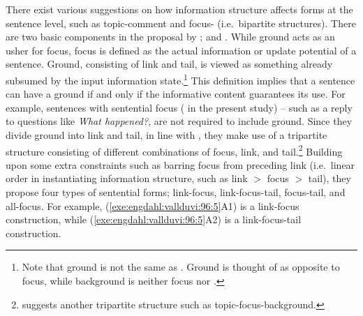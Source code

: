 There exist various suggestions on how information structure affects
forms at the sentence level, such as topic-comment and
focus- (i.e.\ bipartite structures).  There are two basic
components in the proposal by \citeauthor{engdahl:vallduvi:96};
 and . While ground acts as an usher for focus,
focus is defined as the actual information or update potential of a
sentence. Ground, consisting of link and tail, is viewed as something
already subsumed by the input information state.\footnote{Note that
  ground is not the same as . Ground is thought of as
  opposite to focus, while background is neither focus nor
  .}  This definition implies that a sentence can have a
ground if and only if the informative content guarantees its use. For
example, sentences with sentential focus ( in 
the present study) -- such as a reply to
questions like \textit{What happened?}, are not required to include
ground. Since they divide ground into link and tail, in
line with \citet{vallduvi:90}, they make use of a tripartite structure
consisting of different combinations of focus, link, and
tail.\footnote{\citet{buring:03} suggests another tripartite structure
  such as topic-focus-background.} Building upon some extra
constraints such as barring focus from preceding link (i.e.\ linear
order in instantiating information structure, such as link
\ensuremath{>} focus \ensuremath{>} tail), they propose four types of
sentential forms; link-focus, link-focus-tail, focus-tail, and
all-focus. For example, (\ref{exe:engdahl:vallduvi:96:5}A1) is a
link-focus construction, while (\ref{exe:engdahl:vallduvi:96:5}A2) is
a link-focus-tail construction.





